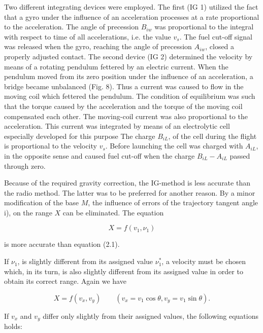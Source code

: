 \documentclass[12pt, a4paper]{article}
\begin{document}
\begin{enumerate}
Two different integrating devices were employed. The first (IG 1) utilized the fact that a gyro under the influence of an acceleration processes at a rate proportional to the acceleration. The angle of precession $B_{iw}$ was proportional to the integral with respect to time of all accelerations, i.e. the value $v_{s}$. The fuel cut-off signal was released when the gyro, reaching the angle of precession $A_{iw}$, closed a properly adjusted contact. The second device (IG 2) determined the velocity by means of a rotating pendulum fettered by an electric current. When the pendulum moved from its zero position under the influence of an acceleration, a bridge became unbalanced (Fig. 8). Thus a current was caused to flow in the moving coil which fettered the pendulum. The condition of equilibrium was such that the torque caused by the acceleration and the torque of the moving coil compensated each other. The moving-coil current was also proportional to the acceleration. This current was integrated by means of an electrolytic cell especially developed for this purpose The charge $B_{iL}$, of the cell during the flight is proportional to the velocity $v_{s}$. Before launching the cell was charged with $A_{iL}$, in the opposite sense and caused fuel cut-off when the charge $B_{iL}-A_{iL}$ passed through zero.

Because of the required gravity correction, the IG-method is less accurate than the radio method. The latter was to be preferred for another reason. By a minor modification of the base $M$, the influence of errors of the trajectory tangent angle i), on the range $X$ can be eliminated. The equation

\begin{equation}
  X=f(v_{1}, \nu_{1})
\end{equation}

is more accurate than equation (2.1).

If $\nu_{1}$, is slightly different from its assigned value  $\nu_{1}^{*}$, a velocity must be chosen which, in its turn, is also slightly different from its assigned value in order to obtain its correct range. Again we have

\begin{equation}
  X=f(v_{x}, v_{y})\quad\quad(v_{x}=v_{1}\cos{\theta}, v_{y}=v_{1}\sin{\theta}).
\end{equation}

If $v_{x}$ and $v_{y}$ differ only slightly from their assigned values, the following
equations holds:


\end{enumerate}
\end{document}
